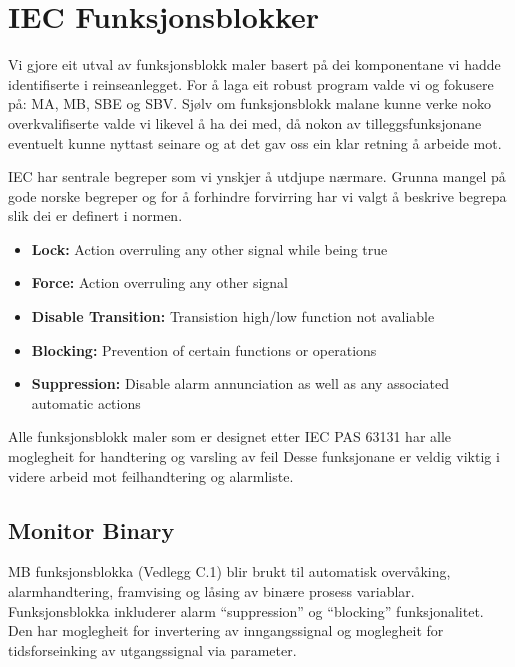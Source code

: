\section{IEC Funksjonsblokker} \label{IEC Seksjon}
\thispagestyle{fancy}

Vi gjore eit utval av funksjonsblokk maler basert på dei komponentane vi hadde identifiserte i reinseanlegget.
For å laga eit robust program valde vi og fokusere på: \gls{MA}, \gls{MB}, \gls{SBE} og \gls{SBV}.
Sjølv om funksjonsblokk malane kunne verke noko overkvalifiserte valde vi likevel å ha dei med, då nokon av tilleggsfunksjonane eventuelt kunne nyttast seinare
og at det gav oss ein klar retning å arbeide mot.

\gls{IEC} har sentrale begreper som vi ynskjer å utdjupe nærmare. Grunna mangel på gode norske begreper 
og for å forhindre forvirring har vi valgt å beskrive begrepa slik dei er definert i normen.

\begin{itemize}
    \item \textbf{Lock:} Action overruling any other signal while being true
    \item \textbf{Force:} Action overruling any other signal
    \item \textbf{Disable Transition:} Transistion high/low function not avaliable
    \item \textbf{Blocking:} Prevention of certain functions or operations 
    \item \textbf{Suppression:} Disable alarm annunciation as well as any associated automatic actions
\end{itemize}

Alle funksjonsblokk maler som er designet etter \gls{IEC} \gls{PAS} 63131 har alle moglegheit for handtering og varsling av feil 
Desse funksjonane er veldig viktig i videre arbeid mot feilhandtering og alarmliste.

\newpage

\subsection{Monitor Binary}
\gls{MB} funksjonsblokka (Vedlegg C.1) blir brukt til automatisk overvåking, alarmhandtering, framvising og låsing av binære prosess variablar.
Funksjonsblokka inkluderer alarm ``suppression'' og ``blocking'' funksjonalitet. Den har moglegheit for invertering av 
inngangssignal og moglegheit for tidsforseinking av utgangssignal via parameter.

